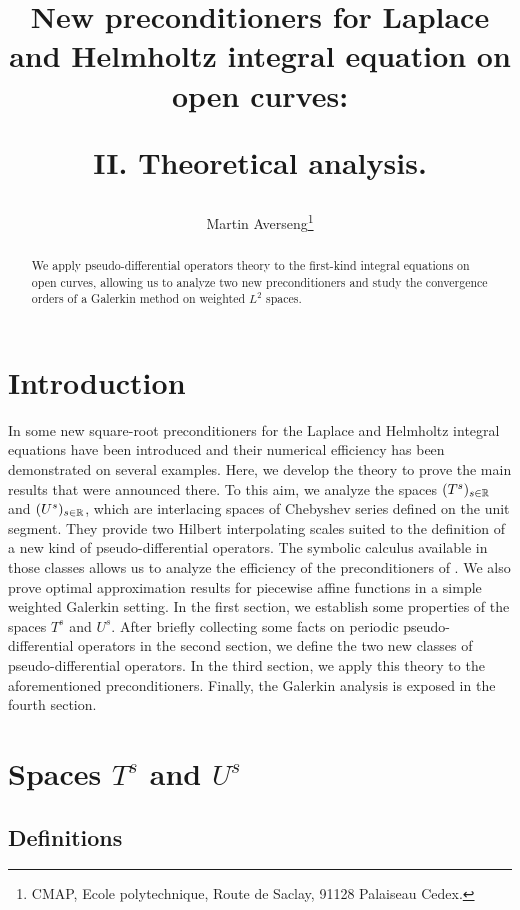 \documentclass[a4paper]{article}
\title{New preconditioners for Laplace and  Helmholtz integral equation on open curves: \\ \vspace{0.5cm}
	\begin{Large} 
		II. Theoretical analysis.
	\end{Large} }
\author{Martin Averseng\footnote{CMAP, Ecole polytechnique, Route de Saclay, 91128 Palaiseau Cedex.}}
\begin{document}
\maketitle

\begin{abstract}
	We apply pseudo-differential operators theory to the first-kind integral equations on open curves, allowing us to analyze two new preconditioners and study the convergence orders of a Galerkin method on weighted $L^2$ spaces.  
\end{abstract}

\section*{Introduction}

In \cite{alouges2018new} some new square-root preconditioners for the Laplace and Helmholtz integral equations have been introduced and their numerical efficiency has been demonstrated on several examples. Here, we develop the theory to prove the main results that were announced there. To this aim, we analyze the spaces $(T^s)_{s\in \mathbb{R}}$ and $(U^s)_{s \in \mathbb{R}}$, which are interlacing spaces of Chebyshev series defined on the unit segment. They provide two Hilbert interpolating scales suited to the definition of a new kind of pseudo-differential operators. The symbolic calculus available in those classes allows us to analyze the efficiency of the preconditioners of \cite{alouges2018new}. We also prove optimal approximation results for piecewise affine functions in a simple weighted Galerkin setting. 
In the first section, we establish some properties of the spaces $T^s$ and $U^s$. After briefly collecting some facts on periodic pseudo-differential operators in the second section, we define the two new classes of pseudo-differential operators. In the third section, we apply this theory to the aforementioned preconditioners. Finally, the Galerkin analysis is exposed in the fourth section. 
 
\section{Spaces $T^s$ and $U^s$}

\subsection{Definitions}

\label{sec:analyticalSetting}
\end{document}
